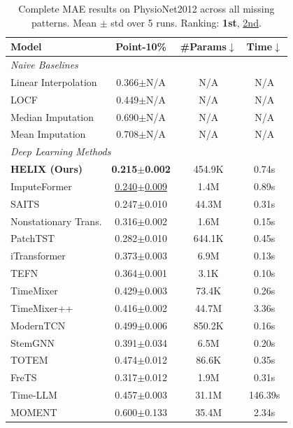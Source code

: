 \begin{table}[h]
    \caption{Complete MAE results on PhysioNet2012 across all missing patterns. Mean $\pm$ std over 5 runs. Ranking: \textbf{1st}, \underline{2nd}.}
    \label{tab:full_physionet2012}
    \centering
    \begin{footnotesize}
    \begin{tabular}{l|c|cc}
        \toprule
        \textbf{Model} & \textbf{Point-10\%} & \textbf{\#Params}$\downarrow$ & \textbf{Time}$\downarrow$ \\
        \midrule
        \multicolumn{4}{l}{\textit{Naive Baselines}} \\
        Linear Interpolation & 0.366$\pm$N/A & N/A & N/A \\
        LOCF & 0.449$\pm$N/A & N/A & N/A \\
        Median Imputation & 0.690$\pm$N/A & N/A & N/A \\
        Mean Imputation & 0.708$\pm$N/A & N/A & N/A \\
        \midrule
        \multicolumn{4}{l}{\textit{Deep Learning Methods}} \\
        \textbf{HELIX (Ours)} & \textbf{0.215$\pm$0.002} & 454.9K & 0.74s \\
        ImputeFormer & \underline{0.240$\pm$0.009} & 1.4M & 0.89s \\
        SAITS & 0.247$\pm$0.010 & 44.3M & 0.31s \\
        Nonstationary Trans. & 0.316$\pm$0.002 & 1.6M & 0.15s \\
        PatchTST & 0.282$\pm$0.010 & 644.1K & 0.45s \\
        iTransformer & 0.373$\pm$0.003 & 6.9M & 0.13s \\
        TEFN & 0.364$\pm$0.001 & 3.1K & 0.10s \\
        TimeMixer & 0.429$\pm$0.003 & 73.4K & 0.26s \\
        TimeMixer++ & 0.416$\pm$0.002 & 44.7M & 3.36s \\
        ModernTCN & 0.499$\pm$0.006 & 850.2K & 0.16s \\
        StemGNN & 0.391$\pm$0.034 & 6.5M & 0.20s \\
        TOTEM & 0.474$\pm$0.012 & 86.6K & 0.35s \\
        FreTS & 0.317$\pm$0.012 & 1.9M & 0.31s \\
        Time-LLM & 0.457$\pm$0.003 & 31.1M & 146.39s \\
        MOMENT & 0.600$\pm$0.133 & 35.4M & 2.34s \\
        \bottomrule
    \end{tabular}
    \end{footnotesize}
\end{table}